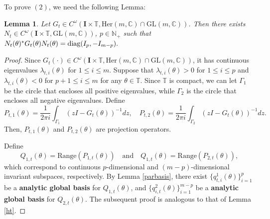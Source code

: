 \documentclass[11pt]{amsart}
\newtheorem{lemma}[theorem]{Lemma}
\theoremstyle{remark}
\theoremstyle{definition}
\newcommand{\I}{{\mathbf I}}
\newcommand{\CC}{{\mathbb C}}
\newcommand{\TT}{{\mathbb T}}
\newcommand{\diag}{{\rm diag}}
\begin{document}
To prove $(2)$, 
we need the following Lemma:
\begin{lemma}	\label{hetong}
			Let $G_t\in C^\omega(\I\times\mathbb{T},\mathrm{Her}(m,\CC)\cap \mathrm{GL}(m,\CC))$. Then there exists  $N_t\in C^\omega(\I\times\mathbb{T}, \mathrm{GL}(m,\CC))$, $p \in \mathbb{N}_+$ such that  $N_t(\theta)^*
			G_t(\theta)N_t(\theta)=\diag (I_p,-I_{m-p}).$
		\end{lemma}
\begin{proof}
		Since $G_t(\cdot)\in C^\omega(\I\times\mathbb{T},\mathrm{Her}(m,\CC)\cap \mathrm{GL}(m,\CC))$, it has continuous eigenvalues $\lambda_{t,i}(\theta)$ for $1 \leq i \leq m$. Suppose that $\lambda_{t,i}(\theta) > 0$ for $1 \leq i \leq p$ and $\lambda_{t,i}(\theta) < 0$ for $p + 1 \leq i \leq m$ for any $\theta\in\TT$.
			Since $\TT$ is compact, we can let $\Gamma_1$ be the circle that encloses all positive eigenvalues, while $\Gamma_2$ is the circle that encloses all negative eigenvalues. Define
			$$
			P_{t,1}(\theta) = \frac{1}{2\pi i}\int_{\Gamma_1}(zI-G_t(\theta))^{-1} dz, \quad P_{t,2}(\theta) = \frac{1}{2\pi i}\int_{\Gamma_2}(zI-G_t(\theta))^{-1} dz.
			$$
			Then, $P_{t,1}(\theta)$ and $P_{t,2}(\theta)$ are projection operators. 
        
			Define
			$$
			Q_{1,t}(\theta) = \text{Range}(P_{1,t}(\theta)) \quad \text{and} \quad Q_{1,t}(\theta) = \text{Range}(P_{2,t}(\theta)),
			$$
			which correspond to continuous $p$-dimensional and $(m-p)$-dimensional invariant subspaces, respectively.
			By Lemma \ref{parbasis}, there exist $\{q^1_{t,i}(\theta)\}_{i=1}^p$ be a \textbf{analytic global basis} for $Q_{1,t}(\theta)$, and $\{q^2_{i,t}(\theta)\}_{i=1}^{m-p}$ be a  \textbf{analytic global basis} for $Q_{2,t}(\theta)$. The subsequent proof is analogous to that of Lemma \ref{ht}.
		\end{proof}
\end{document}
